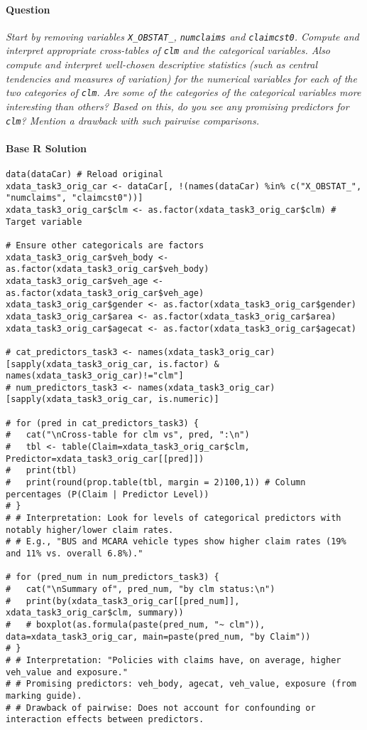 \documentclass[12pt,a4paper]{article}
\newcommand{\Rcode}[1]{\texttt{#1}} %
\begin{document}
        \paragraph{Question}
        \textit{Start by removing variables \Rcode{X\_OBSTAT\_}, \Rcode{numclaims} and \Rcode{claimcst0}. Compute and interpret appropriate cross-tables of \Rcode{clm} and the categorical variables. Also compute and interpret well-chosen descriptive statistics (such as central tendencies and measures of variation) for the numerical variables for each of the two categories of \Rcode{clm}. Are some of the categories of the categorical variables more interesting than others? Based on this, do you see any promising predictors for \Rcode{clm}? Mention a drawback with such pairwise comparisons.}
        \paragraph{Base R Solution}
\begin{lstlisting}[]
data(dataCar) # Reload original
xdata_task3_orig_car <- dataCar[, !(names(dataCar) %in% c("X_OBSTAT_", "numclaims", "claimcst0"))]
xdata_task3_orig_car$clm <- as.factor(xdata_task3_orig_car$clm) # Target variable

# Ensure other categoricals are factors
xdata_task3_orig_car$veh_body <- as.factor(xdata_task3_orig_car$veh_body)
xdata_task3_orig_car$veh_age <- as.factor(xdata_task3_orig_car$veh_age)
xdata_task3_orig_car$gender <- as.factor(xdata_task3_orig_car$gender)
xdata_task3_orig_car$area <- as.factor(xdata_task3_orig_car$area)
xdata_task3_orig_car$agecat <- as.factor(xdata_task3_orig_car$agecat)

# cat_predictors_task3 <- names(xdata_task3_orig_car)[sapply(xdata_task3_orig_car, is.factor) & names(xdata_task3_orig_car)!="clm"]
# num_predictors_task3 <- names(xdata_task3_orig_car)[sapply(xdata_task3_orig_car, is.numeric)]

# for (pred in cat_predictors_task3) {
#   cat("\nCross-table for clm vs", pred, ":\n")
#   tbl <- table(Claim=xdata_task3_orig_car$clm, Predictor=xdata_task3_orig_car[[pred]])
#   print(tbl)
#   print(round(prop.table(tbl, margin = 2)100,1)) # Column percentages (P(Claim | Predictor Level))
# }
# # Interpretation: Look for levels of categorical predictors with notably higher/lower claim rates.
# # E.g., "BUS and MCARA vehicle types show higher claim rates (19% and 11% vs. overall 6.8%)."

# for (pred_num in num_predictors_task3) {
#   cat("\nSummary of", pred_num, "by clm status:\n")
#   print(by(xdata_task3_orig_car[[pred_num]], xdata_task3_orig_car$clm, summary))
#   # boxplot(as.formula(paste(pred_num, "~ clm")), data=xdata_task3_orig_car, main=paste(pred_num, "by Claim"))
# }
# # Interpretation: "Policies with claims have, on average, higher veh_value and exposure."
# # Promising predictors: veh_body, agecat, veh_value, exposure (from marking guide).
# # Drawback of pairwise: Does not account for confounding or interaction effects between predictors.
\end{lstlisting}
\end{document}
